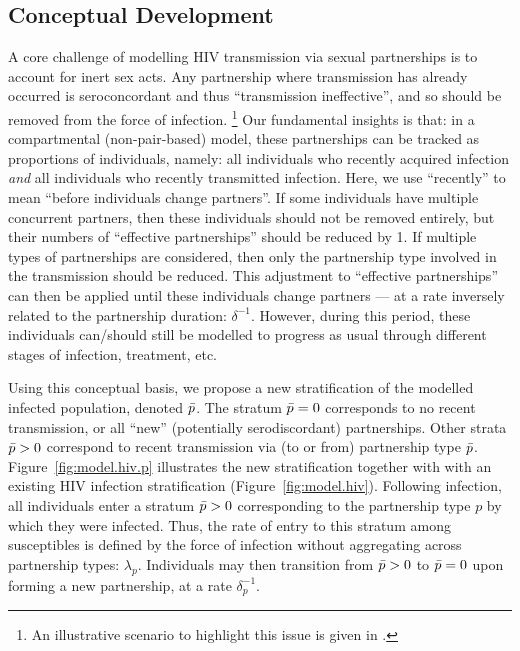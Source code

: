 \subsection{Conceptual Development}\label{foi.prop.concept}
A core challenge of modelling HIV transmission via sexual partnerships is
to account for inert sex acts.
Any partnership where transmission has already occurred
is seroconcordant and thus ``transmission ineffective'',
and so should be removed from the force of infection.%
\footnote{An illustrative scenario to highlight this issue is given in .}
Our fundamental insights is that:
in a compartmental (non-pair-based) model,
these partnerships can be tracked as proportions of individuals, namely:
all individuals who recently acquired infection \emph{and}
all individuals who recently transmitted infection.
Here, we use ``recently'' to mean ``before individuals change partners''.
If some individuals have multiple concurrent partners,
then these individuals should not be removed entirely,
but their numbers of ``effective partnerships'' should be reduced by 1.
If multiple types of partnerships are considered,
then only the partnership type involved in the transmission should be reduced.
This adjustment to ``effective partnerships'' can then be applied
until these individuals change partners
--- at a rate inversely related to the partnership duration: $\delta^{-1}$.
However, during this period, these individuals can/should still be modelled
to progress as usual through different stages of infection, treatment, etc.
\par
Using this conceptual basis,
we propose a new stratification of the modelled infected population, denoted $\bar{p}$.
The stratum $\bar{p} = 0$ corresponds to no recent transmission,
or all ``new'' (potentially serodiscordant) partnerships.
Other strata $\bar{p} > 0$ correspond to recent transmission via (to or from) partnership type $\bar{p}$.
Figure~\ref{fig:model.hiv.p} illustrates the new stratification
together with with an existing HIV infection stratification (Figure~\ref{fig:model.hiv}).
Following infection, all individuals enter a stratum $\bar{p} > 0$
corresponding to the partnership type $p$ by which they were infected.
Thus, the rate of entry to this stratum among susceptibles is defined by
the force of infection without aggregating across partnership types: $\lambda_{p}$.
Individuals may then transition from $\bar{p} > 0$ to $\bar{p} = 0$
upon forming a new partnership, at a rate $\delta_p^{-1}$.
